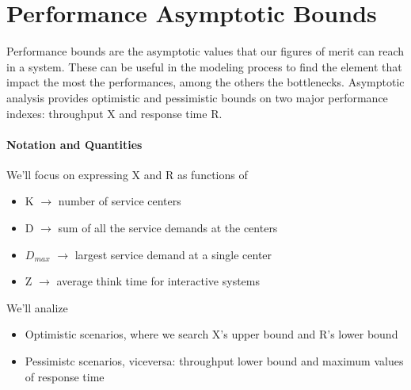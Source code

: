 \documentclass{article}
\begin{document}
		\section{Performance Asymptotic Bounds}
			Performance bounds are the asymptotic values that our figures of merit can reach in a system. These can be useful in the modeling process to find the element that impact the most the performances, among the others the bottlenecks. Asymptotic analysis provides optimistic and pessimistic bounds on two major performance indexes: throughput X and response time R.
			
			\paragraph{Notation and Quantities}
				We'll focus on expressing X and R as functions of
				\begin{itemize}
					\item K $\rightarrow$ number of service centers
					\item D $\rightarrow$ sum of all the service demands at the centers
					\item $D_{max}$ $\rightarrow$ largest service demand at a single center
					\item Z $\rightarrow$ average think time for interactive systems
				\end{itemize}
				We'll analize
				\begin{itemize}
					\item Optimistic scenarios, where we search X's upper bound and R's lower bound
					\item Pessimistc scenarios, viceversa: throughput lower bound and maximum values of response time
				\end{itemize}
			
\end{document}

